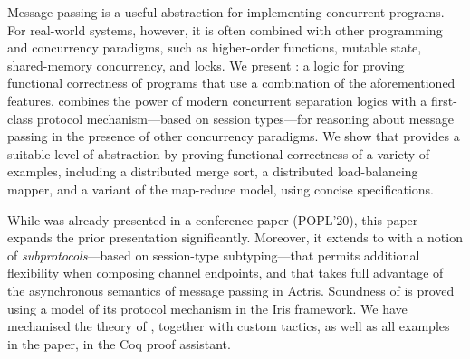 Message passing is a useful abstraction for implementing concurrent
programs.
For real-world systems, however, it is often combined with other programming
and concurrency paradigms, such as
higher-order functions, mutable state, shared-memory concurrency, and locks.
We present \textbf{\lname}: a logic for proving functional correctness of
programs that use a combination of the aforementioned features.
\lname combines the power of modern concurrent separation logics with a
first-class protocol mechanism---based on session types---for
reasoning about message passing in the presence of other concurrency paradigms.
We show that \lname provides a suitable level of abstraction by proving
functional correctness of a variety of examples, including
a distributed merge sort, a distributed load-balancing mapper, and a variant
of the map-reduce model, using concise specifications.

While \lname was already presented in a conference paper (POPL'20), this paper
expands the prior presentation significantly.
Moreover, it extends \lname to \textbf{} with a notion of
\emph{subprotocols}---based on session-type subtyping---that permits additional flexibility when
composing channel endpoints, and that takes full advantage of the asynchronous
semantics of message passing in Actris.
Soundness of  is proved using a model of its protocol mechanism in the
Iris framework.
We have mechanised the theory of \lname, together with custom tactics, as well as
all examples in the paper, in the Coq proof assistant.
